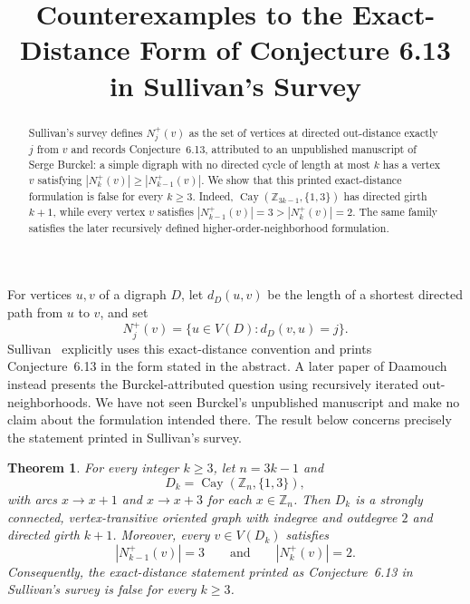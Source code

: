 \documentclass[11pt]{amsart}
\title[Exact-distance counterexamples]
{Counterexamples to the Exact-Distance Form of Conjecture 6.13
in Sullivan's Survey}
\date{}
\newtheorem{theorem}{Theorem}
\theoremstyle{remark}
\newcommand{\Z}{\mathbb{Z}}
\DeclareMathOperator{\Cay}{Cay}
\begin{document}
\begin{abstract}
Sullivan's survey defines $N_j^+(v)$ as the set of vertices at directed
out-distance exactly $j$ from $v$ and records Conjecture~6.13, attributed
to an unpublished manuscript of Serge Burckel: a simple digraph with no
directed cycle of length at most $k$ has a vertex $v$ satisfying
$|N_k^+(v)|\ge |N_{k-1}^+(v)|$. We show that this printed exact-distance
formulation is false for every $k\ge3$. Indeed,
$\Cay(\Z_{3k-1},\{1,3\})$ has directed girth $k+1$, while every vertex $v$
satisfies $|N_{k-1}^+(v)|=3>|N_k^+(v)|=2$. The same family satisfies the
later recursively defined higher-order-neighborhood formulation.
\end{abstract}

\maketitle

For vertices $u,v$ of a digraph $D$, let $d_D(u,v)$ be the length of a
shortest directed path from $u$ to $v$, and set
\[
  N_j^+(v)=\{u\in V(D):d_D(v,u)=j\}.
\]
Sullivan~\cite{Sullivan} explicitly uses this exact-distance convention and
prints Conjecture~6.13 in the form stated in the abstract. A later paper of
Daamouch~\cite{Daamouch} instead presents the Burckel-attributed question
using recursively iterated out-neighborhoods. We have not seen Burckel's
unpublished manuscript and make no claim about the formulation intended
there. The result below concerns precisely the statement printed in
Sullivan's survey.

\begin{theorem}\label{thm:main}
For every integer $k\ge3$, let $n=3k-1$ and
\[
  D_k=\Cay(\Z_n,\{1,3\}),
\]
with arcs $x\to x+1$ and $x\to x+3$ for each $x\in\Z_n$. Then $D_k$ is a
strongly connected, vertex-transitive oriented graph with indegree and
outdegree $2$ and directed girth $k+1$. Moreover, every $v\in V(D_k)$
satisfies
\[
  |N_{k-1}^+(v)|=3
  \qquad\text{and}\qquad
  |N_k^+(v)|=2.
\]
Consequently, the exact-distance statement printed as Conjecture~6.13 in
Sullivan's survey is false for every $k\ge3$.
\end{theorem}
\end{document}
